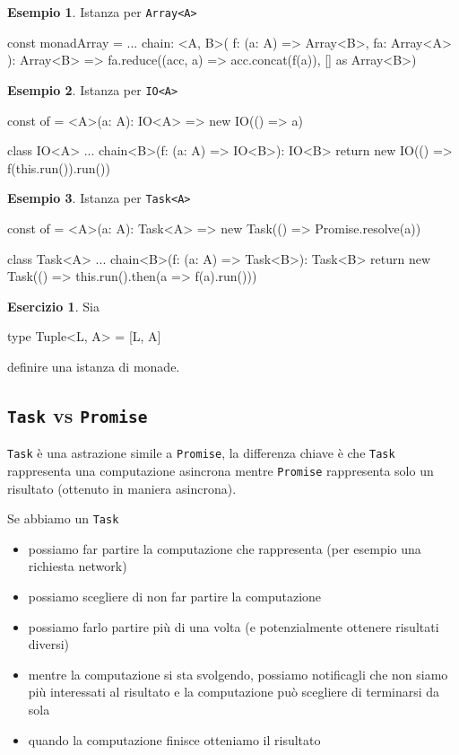 \documentclass[12pt]{article}
\theoremstyle{definition}
\newtheorem{example}{Esempio}[section]
\newtheorem{exercise}{Esercizio}[section]
\newenvironment{code}
  {\vspace{0.5cm} \VerbatimEnvironment\begin{typescriptcode}}
  {\end{typescriptcode} \vspace{0.2cm}}
\begin{document}
\begin{example}
Istanza per \texttt{Array<A>}

\begin{code}
const monadArray = {
  ...
  chain: <A, B>(
    f: (a: A) => Array<B>,
    fa: Array<A>
  ): Array<B> =>
    fa.reduce((acc, a) => acc.concat(f(a)), [] as Array<B>)
}
\end{code}
\end{example}

\begin{example}
Istanza per \texttt{IO<A>}

\begin{code}
const of = <A>(a: A): IO<A> => new IO(() => a)

class IO<A> {
  ...
  chain<B>(f: (a: A) => IO<B>): IO<B> {
    return new IO(() => f(this.run()).run())
  }
}
\end{code}
\end{example}

\begin{example}
Istanza per \texttt{Task<A>}

\begin{code}
const of = <A>(a: A): Task<A> =>
  new Task(() => Promise.resolve(a))

class Task<A> {
  ...
  chain<B>(f: (a: A) => Task<B>): Task<B> {
    return new Task(() => this.run().then(a => f(a).run()))
  }
}
\end{code}
\end{example}

\begin{exercise}
Sia

\begin{code}
type Tuple<L, A> = [L, A]
\end{code}

definire una istanza di monade.
\end{exercise}

\subsection{\texttt{Task} vs \texttt{Promise}}

\texttt{Task} è una astrazione simile a \texttt{Promise}, la differenza chiave è che \texttt{Task} rappresenta una computazione asincrona
mentre \texttt{Promise} rappresenta solo un risultato (ottenuto in maniera asincrona).

Se abbiamo un \texttt{Task}

\begin{itemize}
  \item possiamo far partire la computazione che rappresenta (per esempio una richiesta network)
  \item possiamo scegliere di non far partire la computazione
  \item possiamo farlo partire più di una volta (e potenzialmente ottenere risultati diversi)
  \item mentre la computazione si sta svolgendo, possiamo notificagli che non siamo più interessati al risultato e la computazione può scegliere di terminarsi da sola
  \item quando la computazione finisce otteniamo il risultato
\end{itemize}
\end{document}
